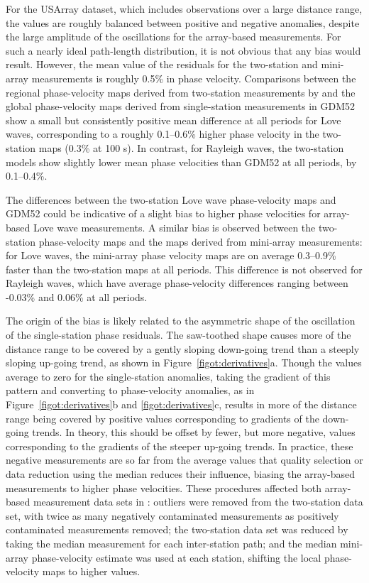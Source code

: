 \documentclass[12pt,oneside]{book}
\begin{document}
For the USArray dataset, which includes observations over a large distance range, the values are roughly balanced between positive and negative anomalies, despite the large amplitude of the oscillations for the array-based measurements. For such a nearly ideal path-length distribution, it is not obvious that any bias would result. However, the mean value of the residuals for the two-station and mini-array measurements is roughly 0.5\% in phase velocity. Comparisons between the regional phase-velocity maps derived from two-station measurements by \citet{Fosteretal2014} and the global phase-velocity maps derived from single-station measurements in GDM52 show a small but consistently positive mean difference at all periods for Love waves, corresponding to a roughly 0.1--0.6\% higher phase velocity in the two-station maps (0.3\% at 100 s). In contrast, for Rayleigh waves, the two-station models show slightly lower mean phase velocities than GDM52 at all periods, by 0.1--0.4\%.  

The differences between the two-station Love wave phase-velocity maps and GDM52 could be indicative of a slight bias to higher phase velocities for array-based Love wave measurements. A similar bias is observed between the two-station phase-velocity maps and the maps derived from mini-array measurements: for Love waves, the mini-array phase velocity maps are on average 0.3--0.9\% faster than the two-station maps at all periods. This difference is not observed for Rayleigh waves, which have average phase-velocity differences ranging between -0.03\% and 0.06\% at all periods. 

The origin of the bias is likely related to the asymmetric shape of the oscillation of the single-station phase residuals. The saw-toothed shape causes more of the distance range to be covered by a gently sloping down-going trend than a steeply sloping up-going trend, as shown in Figure~\ref{figot:derivatives}a. Though the values average to zero for the single-station anomalies, taking the gradient of this pattern and converting to phase-velocity anomalies, as in Figure~\ref{figot:derivatives}b and \ref{figot:derivatives}c, results in more of the distance range being covered by positive values corresponding to gradients of the down-going trends. In theory, this should be offset by fewer, but more negative, values corresponding to the gradients of the steeper up-going trends. In practice, these negative measurements are so far from the average values that quality selection or data reduction using the median reduces their influence, biasing the array-based measurements to higher phase velocities.  These procedures affected both array-based measurement data sets in \citet{Fosteretal2014}: outliers were removed from the two-station data set, with twice as many negatively contaminated measurements as positively contaminated measurements removed; the two-station data set was reduced by taking the median measurement for each inter-station path; and the median mini-array phase-velocity estimate was used at each station, shifting the local phase-velocity maps to higher values. 
\end{document}
